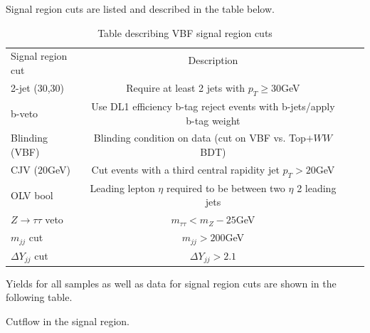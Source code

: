 Signal region cuts are listed and described in the table below.  

\begin{table}[h!]
\centering
\small{
\begin{tabular}{|l|c|c|c|}
\hline
\multirow{2}{*}{Signal region cut}   & Description \\
					&	\\
\hline
2-jet (30,30)           & Require at least 2 jets with $p_T \geq 30$GeV\\
b-veto      		& Use DL1 efficiency b-tag reject events with b-jets/apply b-tag weight \\
Blinding (VBF)          & Blinding condition on data (cut on VBF vs. Top$+WW$ BDT) \\
CJV ($20$GeV)		& Cut events with a third central rapidity jet $p_T > 20$GeV \\
OLV bool	        & Leading lepton $\eta$ required to be between two $\eta$ 2 leading jets \\
$Z\rightarrow\tau\tau$ veto & $m_{\tau\tau} < m_Z - 25$GeV \\ 
$m_{jj}$ cut		& $m_{jj} > 200$GeV \\
$\Delta Y_{jj}$ cut	& $\Delta Y_{jj} > 2.1$ \\
\hline
\end{tabular}
\caption{Table describing VBF signal region cuts}
\label{tab:SRdef}
}
\end{table}

Yields for all samples as well as data for signal region cuts are shown in the following table.
\begin{table}[h!]
\scalebox{0.40}{

}
\caption{Cutflow in the signal region.}
\label{tab:srcut}
\end{table}

